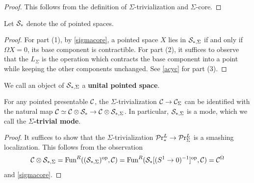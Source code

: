\documentclass[10pt,a4paper,oneside]{article}
\begin{document}
\begin{proof}
This follows from the definition of $\Sigma$-trivialization and $\Sigma$-core.
\end{proof}

\begin{prop}
Let $\mathcal{S}_*$ denote the \infcat of pointed spaces.
\end{prop} 

\begin{proof}
For part (1), by \cref{sigmacore}, a pointed space $X$ lies in $\mathcal{S}_{*,\Sigma}$ if and only if $\Omega X=0$, \ie its base component is contractible. For part (2), it suffices to observe that the $L_\Sigma$ is the operation which contracts the base component into a point while keeping the other components unchanged. See \cref{acyc} for part (3).
\end{proof}



\begin{de}
We call an object of $\mathcal{S}_{*,\Sigma}$ a \textbf{unital pointed space}.
\end{de}

\begin{thm}\label{thm:mode}
For any pointed presentable \infcat $\mathcal{C}$, the $\Sigma$-trivialization $\mathcal{C} \to \mathcal{C}_{\Sigma}$ can be identified with the natural map $\mathcal{C}\simeq \mathcal{C}\otimes \mathcal{S}_*\to \mathcal{C}\otimes\mathcal{S}_{*,\Sigma}$. In particular, $\mathcal{S}_{*,\Sigma}$ is a mode, which we call the \textbf{$\Sigma$-trivial mode}.
\end{thm}

\begin{proof}
It suffices to show that the $\Sigma$-trivialization $\mathcal{P}\mathrm{r}^L_* \to \mathcal{P}\mathrm{r}^L_{\Sigma}$ is a smashing localization. This follows from the observation
\[
\mathcal{C}\otimes\mathcal{S}_{*,\Sigma}=\operatorname{Fun}^R((\mathcal{S}_{*,\Sigma})^{\operatorname{op}},\mathcal{C})=\operatorname{Fun}^R(\mathcal{S}_{*}[(S^1\to 0)^{-1}]^{\operatorname{op}},\mathcal{C})=\mathcal{C}^\Omega
\]
and \cref{sigmacore}.
\end{proof}
\end{document}
